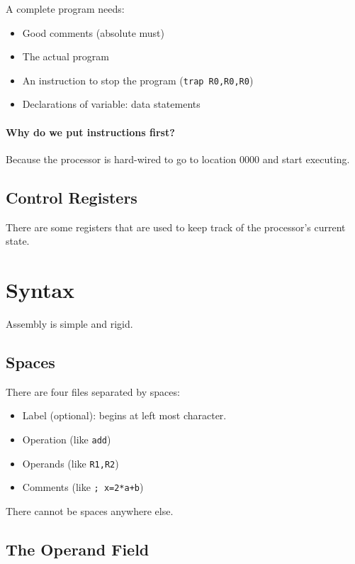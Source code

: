 A complete program needs:
\begin{itemize}
	\item Good comments (absolute must)
	\item The actual program
	\item An instruction to stop the program (\texttt{trap R0,R0,R0})
	\item Declarations of variable: data statements
\end{itemize}

\paragraph{Why do we put instructions first?}
Because the processor is hard-wired to go to location \(0000\) and start executing.

\subsection{Control Registers}\label{sub:control_registers}

There are some registers that are used to keep track of the processor's current state.

\section{Syntax}\label{sec:syntax}

Assembly is simple and rigid.

\subsection{Spaces}\label{sub:spaces}

There are four files separated by spaces:
\begin{itemize}
	\item Label (optional): begins at left most character.
	\item Operation (like \texttt{add})
	\item Operands (like \texttt{R1,R2})
	\item Comments (like \texttt{; x=2*a+b})
\end{itemize}

\begin{note}
	There cannot be spaces anywhere else.
\end{note}

\subsection{The Operand Field}\label{sub:the_operand_field}

